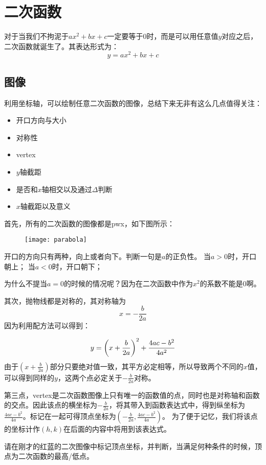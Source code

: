 \section{二次函数}
\label{sec:Qudratic Function}
对于当我们不拘泥于$ax^2+bx+c$一定要等于$0$时，而是可以用任意值$y$对应之后，二次函数就诞生了。其表达形式为：
\[
	y=ax^2+bx+c
\]

\subsection*{图像}
\label{subsec:Parabola as Its Graph}
利用坐标轴，可以绘制任意二次函数的图像，总结下来无非有这么几点值得关注：
\begin{itemize}
	\item 开口方向与大小
	\item 对称性
	\item \gls{vertex}
	\item $y$轴截距
	\item 是否和$x$轴相交以及通过$\Delta$判断
	\item $x$轴截距以及意义
\end{itemize}

首先，所有的二次函数的图像都是\gls{pwx}，如下图所示：
\begin{figure}[H]
\centering
\texttt{[image: parabola]}
\label{二次函数的两种开口}
\end{figure}

开口的方向只有两种，向上或者向下。判断一句是$a$的正负性。
当$a>0$时，开口朝上；
当$a<0$时，开口朝下；

为什么不提当$a=0$的时候的情况呢？因为在二次函数中作为$x^2$的系数不能是0啊。

其次，抛物线都是对称的，其对称轴为
\[
	x=-\frac{b}{2a}
\]
因为利用配方法可以得到：

\[
	y=\left(x+\frac{b}{2a}\right)^2+\frac{4ac-b^2}{4a^2}\\
\]
由于$\left(x+\frac{b}{2a}\right)$部分只要绝对值一致，其平方必定相等，所以导致两个不同的$x$值，可以得到同样的$y$，这两个点必定关于$-\frac{b}{2a}$对称。

第三点，\gls{vertex}是二次函数图像上只有唯一的函数值的点，同时也是对称轴和函数的交点。因此该点的横坐标为$-\frac{b}{2a}$，将其带入到函数表达式中，得到纵坐标为$\frac{4ac-b^2}{4a}$。标记在一起可得顶点坐标为$\left(-\frac{b}{2a}, \frac{4ac-b^2}{4a}\right)$。 为了便于记忆，我们将该点的坐标计作$(h,k)$在后面的内容中将用到该表达式。

\begin{TaskBox} 
请在刚才的红蓝的二次图像中标记顶点坐标，并判断，当满足何种条件的时候，顶点为二次函数的最高/低点。
\end{TaskBox} 

